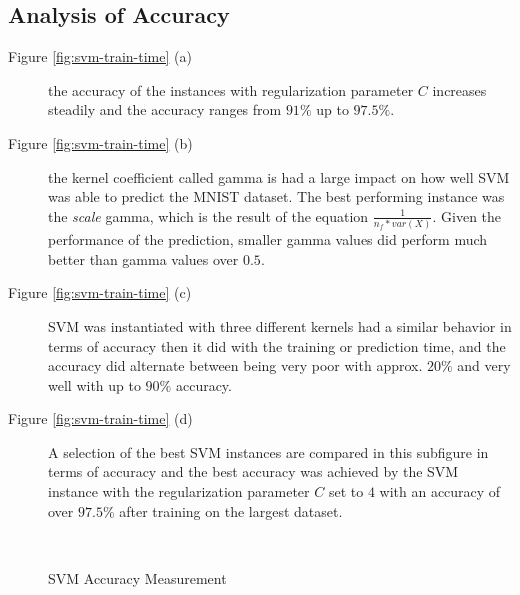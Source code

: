 \documentclass{article}[12pt]
\theoremstyle{mydef}
\begin{document}
        \subsection{Analysis of Accuracy}

            \begin{description}
                \item[Figure \ref{fig:svm-train-time} (a)] the accuracy of the instances with regularization parameter $C$ increases steadily and the accuracy ranges from $91\%$ up to $97.5\%$.
                \item[Figure \ref{fig:svm-train-time} (b)] the kernel coefficient called gamma is had a large impact on how well SVM was able to predict the MNIST dataset. The best performing instance was the \emph{scale} gamma, which is the result of the equation $\frac{1}{n_f * var(X)}$.
                    Given the performance of the prediction, smaller gamma values did perform much better than gamma values over $0.5$.
                \item[Figure \ref{fig:svm-train-time} (c)] SVM was instantiated with three different kernels had a similar behavior in terms of accuracy then it did with the training or prediction time, and the accuracy did alternate between being very poor with approx. $20 \%$ and very well with up to $90 \%$ accuracy.
                \item[Figure \ref{fig:svm-train-time} (d)] A selection of the best SVM instances are compared in this subfigure in terms of accuracy and the best accuracy was achieved by the SVM instance with the regularization parameter $C$ set to $4$ with an accuracy of over $97.5\%$ after training on the largest dataset.
            \end{description}

            \begin{figure}[!h]
                \centering
                \quad
                \\
                \quad
                \caption{SVM Accuracy Measurement}
                \label{fig:svm-accuracy}
            \end{figure}
\end{document}
